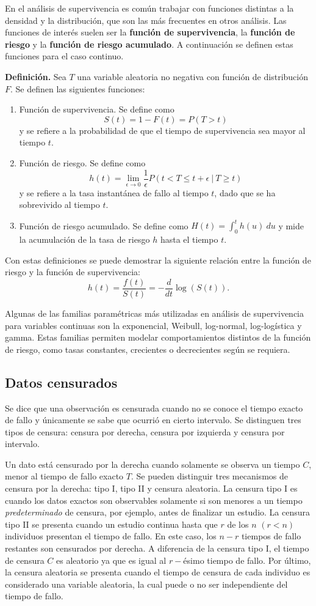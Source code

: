 \documentclass[11pt,a4paper]{article}
\begin{document}
En el análisis de supervivencia es común trabajar con funciones distintas a la densidad y la distribución, que son las más frecuentes en otros análisis. Las funciones de interés suelen ser la \textbf{función de supervivencia}, la \textbf{función de riesgo} y la \textbf{función de riesgo acumulado}. A continuación se definen estas funciones para el caso continuo.

\textbf{Definición.} Sea $T$ una variable aleatoria no negativa con función de distribución $F$. Se definen las siguientes funciones:
\begin{enumerate}
\item Función de supervivencia. Se define como $$S(t) = 1-F(t) = P\left( T > t \right)$$ y se refiere a la probabilidad de que el tiempo de supervivencia sea mayor al tiempo $t$.
\item Función de riesgo. Se define como $$h(t) = \lim_{\epsilon \to 0} \frac{1}{\epsilon}P\left( t<T\leq t+\epsilon \ | \ T \geq t \right)$$ y se refiere a la tasa instantánea de fallo al tiempo $t$, dado que se ha sobrevivido al tiempo $t$.
\item Función de riesgo acumulado. Se define como $H(t) = \int_0^t h(u) \ du$ y mide la acumulación de la tasa de riesgo $h$ hasta el tiempo $t$.
\end{enumerate}
Con estas definiciones se puede demostrar la siguiente relación entre la función de riesgo y la función de supervivencia: $$h(t) = \frac{f(t)}{S(t)} = -\frac{d}{dt}\log(S(t)).$$

Algunas de las familias paramétricas más utilizadas en análisis de supervivencia para variables continuas son la exponencial, Weibull, log-normal, log-logística y gamma. Estas familias permiten modelar comportamientos distintos de la función de riesgo, como tasas constantes, crecientes o decrecientes según se requiera.

\subsection{Datos censurados}

Se dice que una observación es censurada cuando no se conoce el tiempo exacto de fallo y únicamente se sabe que ocurrió en cierto intervalo. Se distinguen tres tipos de censura: censura por derecha, censura por izquierda y censura por intervalo.

Un dato está censurado por la derecha cuando solamente se observa un tiempo $C$, menor al tiempo de fallo exacto $T$. Se pueden distinguir tres mecanismos de censura por la derecha: tipo I, tipo II y censura aleatoria. La censura tipo I es cuando los datos exactos son observables solamente si son menores a un tiempo \textit{predeterminado} de censura, por ejemplo, antes de finalizar un estudio. La censura tipo II se presenta cuando un estudio continua hasta que $r$ de los $n$ $(r<n)$ individuos presentan el tiempo de fallo. En este caso, los $n-r$ tiempos de fallo restantes son censurados por derecha. A diferencia de la censura tipo I, el tiempo de censura $C$ es aleatorio ya que es igual al $r-$ésimo tiempo de fallo. Por último, la censura aleatoria se presenta cuando el tiempo de censura de cada individuo es considerado una variable aleatoria, la cual puede o no ser independiente del tiempo de fallo.
\end{document}

